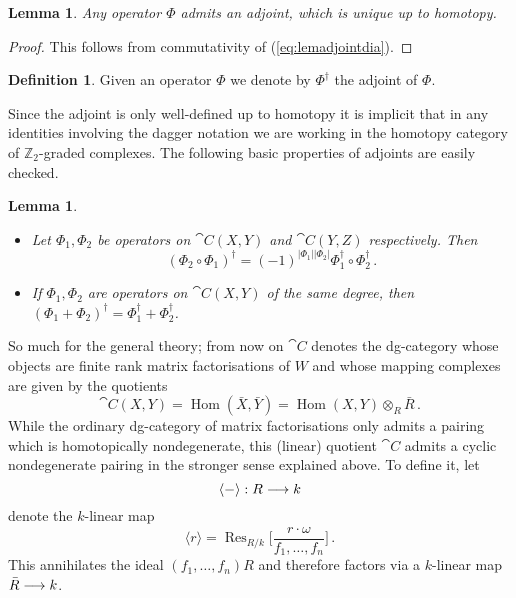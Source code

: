 \documentclass{compositio}
\newtheorem{lemma}[theorem]{Lemma}
\theoremstyle{definition}
\newtheorem{definition}[theorem]{Definition}
\numberwithin{equation}{section}
\newcommand{\Ress}[1]{\res_{#1}\!}
\def\res{\operatorname{Res}}
\def\Hom{\operatorname{Hom}}
\begin{document}
\begin{lemma} Any operator $\Phi$ admits an adjoint, which is unique up to homotopy. 
\end{lemma}
\begin{proof}
This follows from commutativity of (\ref{eq:lemadjointdia}).
\end{proof}

\begin{definition} Given an operator $\Phi$ we denote by $\Phi^{\dagger}$ the adjoint of $\Phi$.
\end{definition}

Since the adjoint is only well-defined up to homotopy it is implicit that in any identities involving the dagger notation we are working in the homotopy category of $\mathbb{Z}_2$-graded complexes. The following basic properties of adjoints are easily checked.

\begin{lemma} 
\begin{itemize}
\item[(i)] Let $\Phi_1, \Phi_2$ be operators on $\cat{C}(X,Y)$ and $\cat{C}(Y,Z)$ respectively. Then
\[
(\Phi_2 \circ \Phi_1)^{\dagger} = (-1)^{|\Phi_1||\Phi_2|} \Phi_1^{\dagger} \circ \Phi_2^{\dagger}\,.
\]
\item[(ii)] If $\Phi_1, \Phi_2$ are operators on $\cat{C}(X,Y)$ of the same degree, then $(\Phi_1 + \Phi_2)^{\dagger} = \Phi_1^{\dagger} + \Phi_2^{\dagger}$.
\end{itemize}
\end{lemma}

So much for the general theory; from now on $\cat{C}$ denotes the dg-category whose objects are finite rank matrix factorisations of $W$ and whose mapping complexes are given by the quotients
\[
\cat{C}(X,Y) = \Hom(\bar{X}, \bar{Y}) = \Hom(X,Y) \otimes_R \bar{R}\,.
\]
While the ordinary dg-category of matrix factorisations only admits a pairing which is homotopically nondegenerate, this (linear) quotient $\cat{C}$ admits a cyclic nondegenerate pairing in the stronger sense explained above. To define it, let
\[
\langle - \rangle: R \longrightarrow k
\]
denote the $k$-linear map
\[
\langle r \rangle = \Ress{R/k}\Bigg[ \frac{r \cdot \omega}{ f_1, \ldots, f_n} \Bigg]\,.
\]
This annihilates the ideal $(f_1,\ldots,f_n)R$ and therefore factors via a $k$-linear map $\bar{R} \longrightarrow k$.
\end{document}
